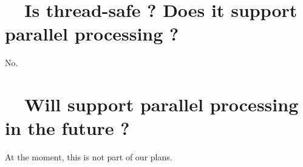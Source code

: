 \section{~~Is {\maniFEM} thread-safe ? Does it support parallel processing ?}
\label{\numb section 13.\numb parag 3}

No.


\section{~~Will {\maniFEM} support parallel processing in the future ?}
\label{\numb section 13.\numb parag 4}

At the moment, this is not part of our plans.




